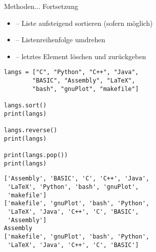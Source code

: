 \begin{frame}[fragile]
%
\begin{Large}
Methoden... Fortsetzung
\vspace{6pt}
\end{Large}
\begin{itemize}
\item {} -- Liste aufsteigend sortieren (sofern möglich)
\item {} -- Listenreihenfolge umdrehen
\item {} -- letztes Element löschen und zurückgeben
\end{itemize}
%
\begin{tcbraster}[raster columns=2,
                  raster equal height,
                  nobeforeafter,
                  raster column skip=0.5cm]
\begin{codebox}[Beispiel: \texttt{is} vs. \texttt{==}]
\begin{verbatim}
langs = ["C", "Python", "C++", "Java",
        "BASIC", "Assembly", "LaTeX",
        "bash", "gnuPlot", "makefile"]

langs.sort()
print(langs)

langs.reverse()
print(langs)

print(langs.pop())
print(langs)
\end{verbatim}
\end{codebox}
%
\begin{cmdbox}[Ausgabe]
\begin{verbatim}
['Assembly', 'BASIC', 'C', 'C++', 'Java',
 'LaTeX', 'Python', 'bash', 'gnuPlot',
 'makefile']
['makefile', 'gnuPlot', 'bash', 'Python',
 'LaTeX', 'Java', 'C++', 'C', 'BASIC',
 'Assembly']
Assembly
['makefile', 'gnuPlot', 'bash', 'Python',
 'LaTeX', 'Java', 'C++', 'C', 'BASIC']
\end{verbatim}
\end{cmdbox}
\end{tcbraster}
%
\end{frame}